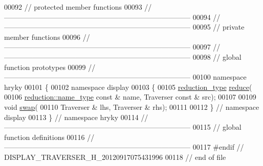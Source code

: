 \begin{DoxyCode}
00092 \textcolor{comment}{// protected member functions}
00093 \textcolor{comment}{//
      ------------------------------------------------------------------------------}
00094 \textcolor{comment}{//
      ------------------------------------------------------------------------------}
00095 \textcolor{comment}{// private member functions}
00096 \textcolor{comment}{//
      ------------------------------------------------------------------------------}
00097 \textcolor{comment}{//
      ------------------------------------------------------------------------------}
00098 \textcolor{comment}{// global function prototypes}
00099 \textcolor{comment}{//
      ------------------------------------------------------------------------------}
00100 \textcolor{keyword}{namespace }hryky
00101 \{
00102 \textcolor{keyword}{namespace }display
00103 \{
00105     \hyperlink{namespacehryky_a343a9a4c36a586be5c2693156200eadc}{reduction_type} \hyperlink{namespacehryky_1_1display_a705ac3a5de0998e1e0d3fa595044ec55}{reduce}(
00106         \hyperlink{namespacehryky_1_1reduction_ac686c30a4c8d196bbd0f05629a6b921f}{reduction::name_type} \textcolor{keyword}{const} & name, Traverser \textcolor{keyword}{const} & src);
00107 
00109     \textcolor{keywordtype}{void} \hyperlink{namespacehryky_1_1display_ad28f0d5e406742090973e6c81321a00f}{swap}(
00110         Traverser & lhs, Traverser & rhs);
00111 
00112 \} \textcolor{comment}{// namespace display}
00113 \} \textcolor{comment}{// namespace hryky}
00114 \textcolor{comment}{//
      ------------------------------------------------------------------------------}
00115 \textcolor{comment}{// global function definitions}
00116 \textcolor{comment}{//
      ------------------------------------------------------------------------------}
00117 \textcolor{preprocessor}{#endif // DISPLAY\_TRAVERSER\_H\_20120917075431996}
00118 \textcolor{preprocessor}{}\textcolor{comment}{// end of file}
\end{DoxyCode}
